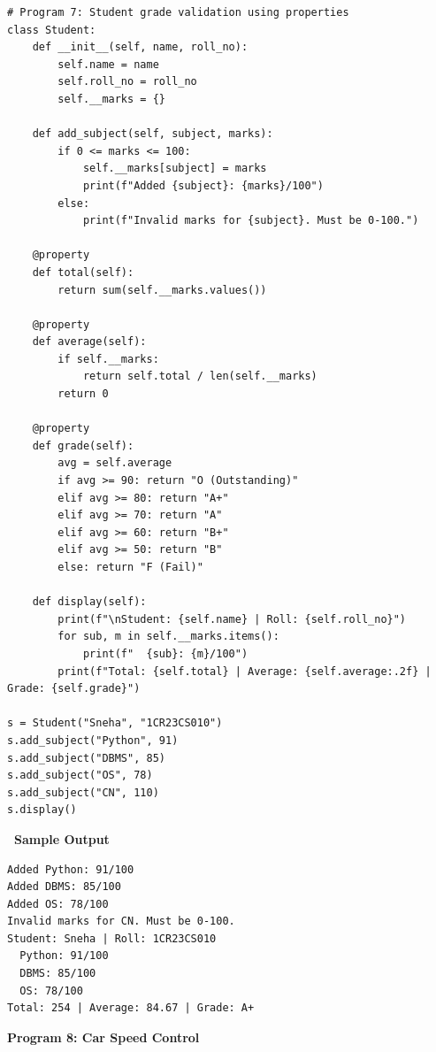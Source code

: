 \documentclass[12pt,a4paper]{article}
\newcommand{\outhead}{\noindent\colorbox{cmrgreen!25}%
  {\textbf{\small\color{cmrdark}~Sample Output~}}\par\vspace{-1pt}}
\begin{document}
\begin{lstlisting}
# Program 7: Student grade validation using properties
class Student:
    def __init__(self, name, roll_no):
        self.name = name
        self.roll_no = roll_no
        self.__marks = {}

    def add_subject(self, subject, marks):
        if 0 <= marks <= 100:
            self.__marks[subject] = marks
            print(f"Added {subject}: {marks}/100")
        else:
            print(f"Invalid marks for {subject}. Must be 0-100.")

    @property
    def total(self):
        return sum(self.__marks.values())

    @property
    def average(self):
        if self.__marks:
            return self.total / len(self.__marks)
        return 0

    @property
    def grade(self):
        avg = self.average
        if avg >= 90: return "O (Outstanding)"
        elif avg >= 80: return "A+"
        elif avg >= 70: return "A"
        elif avg >= 60: return "B+"
        elif avg >= 50: return "B"
        else: return "F (Fail)"

    def display(self):
        print(f"\nStudent: {self.name} | Roll: {self.roll_no}")
        for sub, m in self.__marks.items():
            print(f"  {sub}: {m}/100")
        print(f"Total: {self.total} | Average: {self.average:.2f} | Grade: {self.grade}")

s = Student("Sneha", "1CR23CS010")
s.add_subject("Python", 91)
s.add_subject("DBMS", 85)
s.add_subject("OS", 78)
s.add_subject("CN", 110)
s.display()
\end{lstlisting}

\outhead
\begin{lstlisting}[style=outputstyle]
Added Python: 91/100
Added DBMS: 85/100
Added OS: 78/100
Invalid marks for CN. Must be 0-100.
Student: Sneha | Roll: 1CR23CS010
  Python: 91/100
  DBMS: 85/100
  OS: 78/100
Total: 254 | Average: 84.67 | Grade: A+
\end{lstlisting}

\vspace{0.5cm}

\textbf{Program 8: Car Speed Control}
\end{document}
